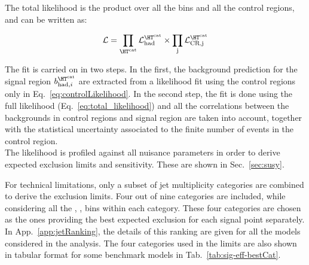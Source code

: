 The total likelihood is the product over all the \htcat bins and all the control regions, and can be written as:

\begin{equation}
\label{eq:total_likelihood}
\mathcal{L} = \prod_{\htcat} \mathcal{L}_{\text{had}}^{\htcat} \times \prod_{\text{j}} \mathcal{L}_{\text{CR,j}}^{\htcat}
\end{equation}

The fit is carried on in two steps. 
In the first, the background prediction for the signal region $b^{\htcat}_{\mathrm{had},i}$ are extracted from a likelihood fit 
using the control regions only in Eq.~\ref{eq:controlLikelihood}. 
In the second step, the fit is done using the full likelihood (Eq.~\ref{eq:total_likelihood}) and all 
the correlations between the backgrounds in control regions and signal region are taken into account, 
together with the statistical uncertainty associated to the finite number of events in the control region. \\
The likelihood is profiled against all nuisance parameters in order to derive expected exclusion limits and sensitivity. 
These are shown in Sec.~\ref{sec:susy}. 

For technical limitations, only a subset of jet multiplicity categories are combined to derive the exclusion limits. 
Four out of nine \nj categories are included, while considering all the \nb, \scalht, \mht bins within each \nj category. 
These four categories are chosen as the ones providing the best expected exclusion for each signal point separately. \\
In App.~\ref{app:jetRanking}, the details of this ranking are given for all the models considered in the analysis. 
The four categories used in the limits are also shown in tabular format for some benchmark models in Tab.~\ref{tab:sig-eff-bestCat}.




